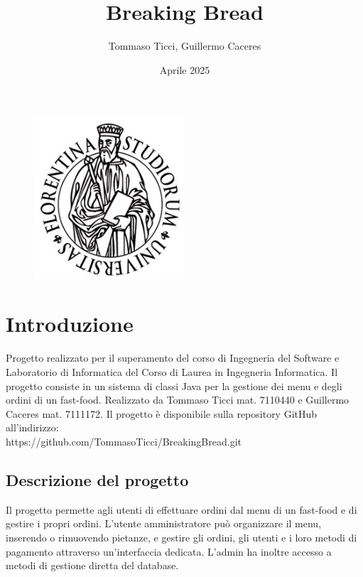 \documentclass{article}
\title{Breaking Bread}
\author{Tommaso Ticci, Guillermo Caceres}
\date{Aprile 2025}
\begin{document}
\maketitle

\begin{figure}[h]
    \centering
    \includegraphics[width=0.5\textwidth]{imgs/Logo_unifi.jpg}

    \label{fig:logo}
\end{figure}

\clearpage 

\tableofcontents
\newpage

\section{Introduzione}
Progetto realizzato per il superamento del corso di Ingegneria del Software e Laboratorio di Informatica del Corso di Laurea in Ingegneria Informatica. Il progetto consiste in un sistema di classi Java per la gestione dei menu e degli ordini di un fast-food. Realizzato da Tommaso Ticci mat. 7110440 e Guillermo Caceres mat. 7111172. Il progetto è disponibile sulla repository GitHub all'indirizzo:\\ https://github.com/TommasoTicci/BreakingBread.git

\subsection{Descrizione del progetto}
Il progetto permette agli utenti di effettuare ordini dal menu di un fast-food e di gestire i propri ordini. L'utente amministratore può organizzare il menu, inserendo o rimuovendo pietanze, e gestire gli ordini, gli utenti e i loro metodi di pagamento attraverso un'interfaccia dedicata. L'admin ha inoltre accesso a metodi di gestione diretta del database.
\end{document}
